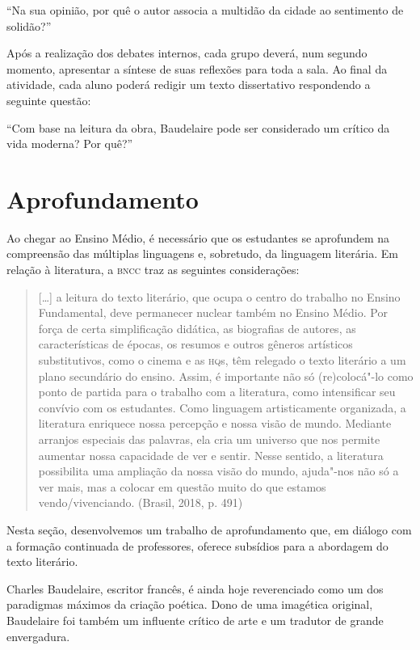 \documentclass[12pt]{extarticle}
\begin{document}
``Na sua opinião, por quê o autor associa a multidão da cidade ao sentimento de solidão?''

Após a realização dos debates internos, cada grupo deverá, num segundo momento, apresentar a síntese de suas reflexões para toda a sala. Ao final da atividade, cada aluno poderá redigir um texto dissertativo respondendo a seguinte questão:

``Com base na leitura da obra, Baudelaire pode ser considerado um crítico da vida moderna? Por quê?''

\section{Aprofundamento}

Ao chegar ao Ensino Médio, é necessário que os estudantes se aprofundem
na compreensão das múltiplas linguagens e, sobretudo, da linguagem
literária. Em relação à literatura, a \textsc{bncc} traz as seguintes
considerações:

\begin{quote}
{[}\ldots{}{]} a leitura do texto literário, que ocupa o centro do trabalho
no Ensino Fundamental, deve permanecer nuclear também no Ensino Médio.
Por força de certa simplificação didática, as biografias de autores, as
características de épocas, os resumos e outros gêneros artísticos
substitutivos, como o cinema e as \textsc{hq}s, têm relegado o texto literário a
um plano secundário do ensino. Assim, é importante não só (re)colocá"-lo
como ponto de partida para o trabalho com a literatura, como
intensificar seu convívio com os estudantes. Como linguagem
artisticamente organizada, a literatura enriquece nossa percepção e
nossa visão de mundo. Mediante arranjos especiais das palavras, ela cria
um universo que nos permite aumentar nossa capacidade de ver e sentir.
Nesse sentido, a literatura possibilita uma ampliação da nossa visão do
mundo, ajuda"-nos não só a ver mais, mas a colocar em questão muito do
que estamos vendo/vivenciando. (Brasil, 2018, p. 491)
\end{quote}

Nesta seção, desenvolvemos um trabalho de aprofundamento que, em diálogo
com a formação continuada de professores, oferece subsídios para a
abordagem do texto literário.

Charles Baudelaire, escritor francês, é ainda hoje reverenciado como
um dos paradigmas máximos da criação poética.
Dono de uma imagética original, Baudelaire foi também um influente
crítico de arte e um tradutor de grande envergadura.
\end{document}
